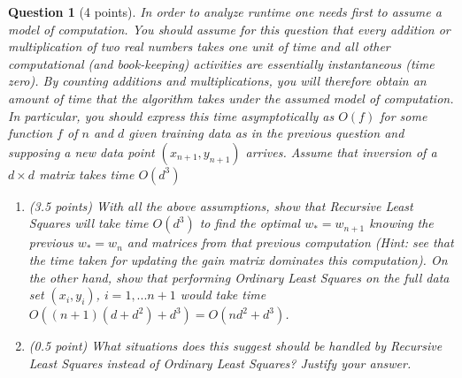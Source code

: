 \documentclass[12pt]{article}
\newtheorem{question}{Question}
\begin{document}
\newpage
\begin{question}[4 points]
  In order to analyze runtime one needs first to assume a model of computation.  You should assume for this question that every addition or multiplication of two real numbers takes one unit of time and all other computational (and book-keeping) activities are essentially instantaneous (time  zero). By  counting  additions and multiplications, you  will therefore obtain an amount of time that the algorithm takes under the assumed model of computation. In particular, you should express this time asymptotically as $O(f)$ for some function $f$ of $n$ and $d$ given training data as in the previous question and supposing a new data point $(x_{n+1}, y_{n+1})$ arrives.  Assume that inversion of a $d \times d$ matrix takes time $O(d^3)$
  \begin{enumerate}
  \item (3.5 points) With all the above assumptions, show that Recursive Least Squares will take time $O(d^3)$ to find the optimal $w_{*} = w_{n+1}$ knowing the previous $w_{*}=w_n$ and matrices from that previous computation (Hint:  see that the time taken for updating the gain matrix dominates this computation). On the other hand, show that performing Ordinary Least Squares on the full data set $(x_i, y_i)$, $ i= 1, . . . n+ 1$ would take time $O((n+ 1)(d+d^2) +d^3) =O(nd^2+d^3)$.
  \item
    (0.5 point) What situations does this suggest should be handled by Recursive Least Squares instead of Ordinary Least Squares?  Justify your answer.
  \end{enumerate}
\end{question}
\end{document}
